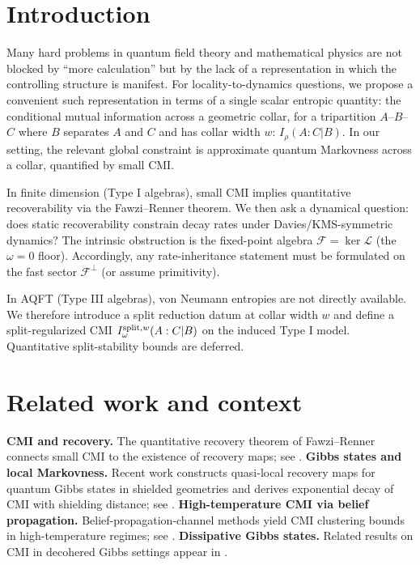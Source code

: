 \documentclass[11pt]{article}
\theoremstyle{remark}
\begin{document}
\tableofcontents

\section{Introduction}
Many hard problems in quantum field theory and mathematical physics are
not blocked by ``more calculation'' but by the lack of a representation in
which the controlling structure is manifest. For locality-to-dynamics
questions, we propose a convenient such representation in terms of a single
scalar entropic quantity: the conditional mutual information across a
geometric collar, for a tripartition $A$--$B$--$C$ where $B$ separates $A$
and $C$ and has collar width $w$: $I_\rho(A:C|B)$. In our setting, the
relevant global constraint is approximate quantum Markovness across a
collar, quantified by small CMI.

In finite dimension (Type I algebras), small CMI implies quantitative
recoverability via the Fawzi--Renner theorem. We then ask a dynamical
question: does static recoverability constrain decay rates under
Davies/KMS-symmetric dynamics? The intrinsic obstruction is the fixed-point
algebra $\mathcal{F} = \ker\mathcal{L}$ (the $\omega = 0$ floor).
Accordingly, any rate-inheritance statement must be formulated on the fast
sector $\mathcal{F}^\perp$ (or assume primitivity).

In AQFT (Type III algebras), von Neumann entropies are not directly
available. We therefore introduce a split reduction datum at collar width
$w$ and define a split-regularized CMI $I_\omega^{{\rm split},w}(A:C|B)$ on
the induced Type I model. Quantitative split-stability bounds are deferred.

\section{Related work and context}
\textbf{CMI and recovery.} The quantitative recovery theorem of
Fawzi--Renner connects small CMI to the existence of recovery maps; see
\cite{FR}. \textbf{Gibbs states and local Markovness.} Recent work
constructs quasi-local recovery maps for quantum Gibbs states in shielded
geometries and derives exponential decay of CMI with shielding distance;
see \cite{CR}. \textbf{High-temperature CMI via belief propagation.}
Belief-propagation-channel methods yield CMI clustering bounds in
high-temperature regimes; see \cite{KK}. \textbf{Dissipative Gibbs states.}
Related results on CMI in decohered Gibbs settings appear in \cite{ZG}.
\end{document}
